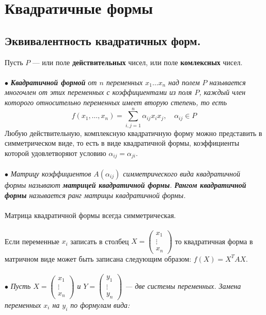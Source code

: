 \chapter{Квадратичные формы}
\section{Эквивалентность квадратичных форм.}
Пусть $P$ --- или поле \textbf{действительных} чисел, или поле \textbf{комлексных} чисел.\\\\
$\bullet$ \textit{\textbf{Квадратичной формой} от $n$ переменных $x_1 \dots x_n$ над полем $P$ называется многочлен от этих переменных с коэффициентами из поля $P$, каждый член которого относительно переменных имеет вторую степень, то есть} $$f(x_1, \dots, x_n) = \sum\limits_{i,j=1}^n \alpha_{ij} x_i x_j, \quad \alpha_{ij}\in P$$
Любую действительную, комплексную квадратичную форму можно представить в симметрическом виде, то есть в виде квадратичной формы, коэффициенты которой удовлетворяют условию $\alpha_{ij} = \alpha_{ji}$.\\\\
$\bullet$ \textit{Матрицу коэффициентов $A(\alpha_{ij})$ симметрического вида квадратичной формы называют \textbf{матрицей квадратичной формы}. \textbf{Рангом квадратичной формы} называется ранг матрицы квадратичной формы.}\\\\
Матрица квадратичной формы всегда симметрическая.\\\\
Если переменные $x_i$ записать в столбец $X = \begin{pmatrix} x_1 \\ \vdots \\ x_n \end{pmatrix}$ то квадратичная форма в матричном виде может быть записана следующим образом: $f(X) = X^T A X.$\\\\
$\bullet$ \textit{Пусть $X = \begin{pmatrix} x_1 \\ \vdots \\ x_n \end{pmatrix}$ и $Y = \begin{pmatrix} y_1 \\ \vdots \\ y_n \end{pmatrix}$ --- две системы переменных. Замена переменных $x_i$ на $y_i$ по формулам вида:}
